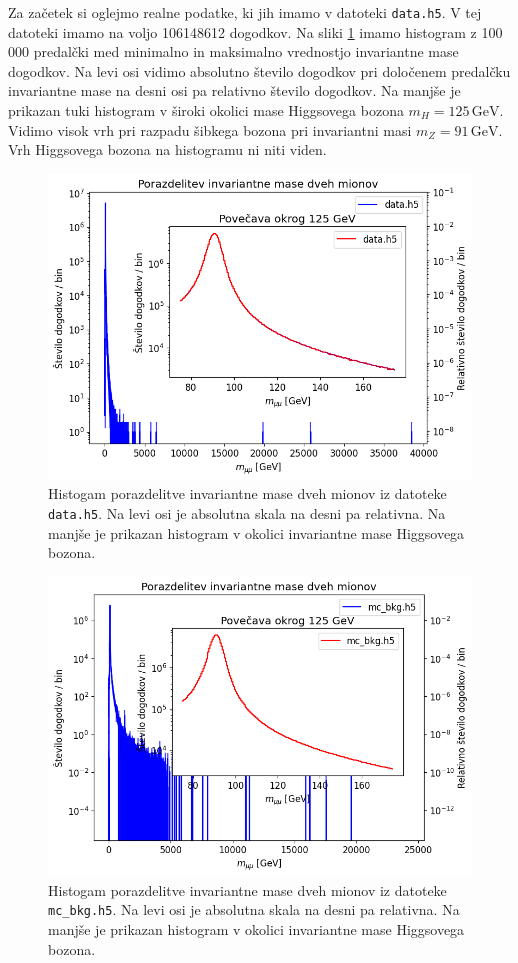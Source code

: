 \documentclass[slovene,11pt,a4paper]{article}
\begin{document}
Za začetek si oglejmo realne podatke, ki jih imamo v datoteki \texttt{data.h5}. V tej datoteki imamo na voljo 106148612 dogodkov. Na sliki \ref{fig:data} imamo histogram z 100 000 predalčki med minimalno in maksimalno vrednostjo invariantne mase dogodkov. Na levi osi vidimo absolutno število dogodkov pri določenem predalčku invariantne mase na desni osi pa relativno število dogodkov. Na manjše je prikazan tuki histogram v široki okolici mase Higgsovega bozona $m_H = 125 \, \text{GeV}$. Vidimo visok vrh pri razpadu šibkega bozona pri invariantni masi $m_Z = 91 \, \text{GeV}$. Vrh Higgsovega bozona na histogramu ni niti viden.

\begin{figure}[h!]
    \centering
    \includegraphics[width=0.8\linewidth]{imgs/data.png}
    \caption{Histogam porazdelitve invariantne mase dveh mionov iz datoteke \texttt{data.h5}. Na levi osi je absolutna skala na desni pa relativna. Na manjše je prikazan histogram v okolici invariantne mase Higgsovega bozona.}
    \label{fig:data}
\end{figure}

\begin{figure}[h!]
    \centering
    \includegraphics[width=0.8\linewidth]{imgs/mc_bkg.png}
    \caption{Histogam porazdelitve invariantne mase dveh mionov iz datoteke \texttt{mc\_bkg.h5}. Na levi osi je absolutna skala na desni pa relativna. Na manjše je prikazan histogram v okolici invariantne mase Higgsovega bozona.}
    \label{fig:mc_bkg}
\end{figure}
\end{document}
